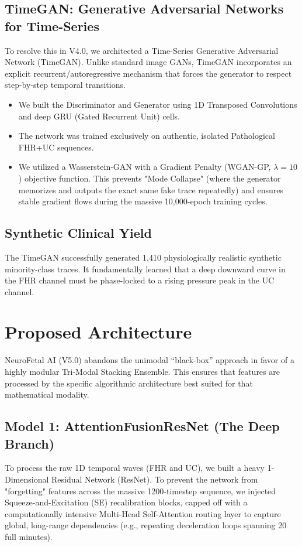 \documentclass[12pt,a4paper]{report}
\begin{document}
\section{TimeGAN: Generative Adversarial Networks for Time-Series}
To resolve this in V4.0, we architected a Time-Series Generative Adversarial Network (TimeGAN). Unlike standard image GANs, TimeGAN incorporates an explicit recurrent/autoregressive mechanism that forces the generator to respect step-by-step temporal transitions. 
\begin{itemize}
    \item We built the Discriminator and Generator using 1D Transposed Convolutions and deep GRU (Gated Recurrent Unit) cells.
    \item The network was trained exclusively on authentic, isolated Pathological FHR+UC sequences.
    \item We utilized a Wasserstein-GAN with a Gradient Penalty (WGAN-GP, $\lambda=10$) objective function. This prevents "Mode Collapse" (where the generator memorizes and outputs the exact same fake trace repeatedly) and ensures stable gradient flows during the massive 10,000-epoch training cycles.
\end{itemize}

\section{Synthetic Clinical Yield}
The TimeGAN successfully generated 1,410 physiologically realistic synthetic minority-class traces. It fundamentally learned that a deep downward curve in the FHR channel must be phase-locked to a rising pressure peak in the UC channel. 

\chapter{Proposed Architecture}
NeuroFetal AI (V5.0) abandons the unimodal ``black-box'' approach in favor of a highly modular Tri-Modal Stacking Ensemble. This ensures that features are processed by the specific algorithmic architecture best suited for that mathematical modality.

\section{Model 1: AttentionFusionResNet (The Deep Branch)}
To process the raw 1D temporal waves (FHR and UC), we built a heavy 1-Dimensional Residual Network (ResNet). To prevent the network from "forgetting" features across the massive 1200-timestep sequence, we injected Squeeze-and-Excitation (SE) recalibration blocks, capped off with a computationally intensive Multi-Head Self-Attention routing layer to capture global, long-range dependencies (e.g., repeating deceleration loops spanning 20 full minutes).
\end{document}
